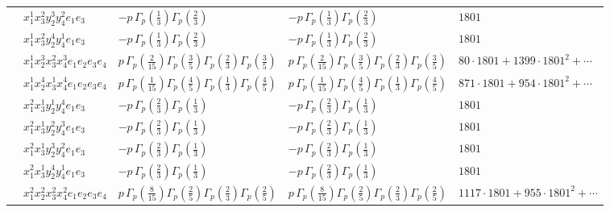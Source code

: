 \documentclass[11pt]{article}
\begin{document}
\begin{table}[ht]
{\begin{tabular}{@{}lllll@{}}
 & $x_{1}^{1} x_{3}^{2} y_{2}^{3} y_{4}^{2} e_{1} e_{3}$ & $- p \, \Gamma_p \left( \frac{1}{3} \right) \Gamma_p \left( \frac{2}{3} \right)$ & $- p \, \Gamma_p \left( \frac{1}{3} \right) \Gamma_p \left( \frac{2}{3} \right)$ & $1801$ \\
 & $x_{1}^{1} x_{3}^{2} y_{2}^{4} y_{4}^{1} e_{1} e_{3}$ & $- p \, \Gamma_p \left( \frac{1}{3} \right) \Gamma_p \left( \frac{2}{3} \right)$ & $- p \, \Gamma_p \left( \frac{1}{3} \right) \Gamma_p \left( \frac{2}{3} \right)$ & $1801$ \\
 & $x_{1}^{1} x_{2}^{3} x_{3}^{2} x_{4}^{3}  e_{1} e_{2} e_{3} e_{4}$ & $p \, \Gamma_p \left( \frac{2}{15} \right) \Gamma_p \left( \frac{3}{5} \right) \Gamma_p \left( \frac{2}{3} \right) \Gamma_p \left( \frac{3}{5} \right)$ & $p \, \Gamma_p \left( \frac{2}{15} \right) \Gamma_p \left( \frac{3}{5} \right) \Gamma_p \left( \frac{2}{3} \right) \Gamma_p \left( \frac{3}{5} \right)$ & $80{\cdot}1801{+}1399{\cdot}1801^{2}{+}\cdots$ \\
 & $x_{1}^{1} x_{2}^{4} x_{3}^{1} x_{4}^{4}  e_{1} e_{2} e_{3} e_{4}$ & $p \, \Gamma_p \left( \frac{1}{15} \right) \Gamma_p \left( \frac{4}{5} \right) \Gamma_p \left( \frac{1}{3} \right) \Gamma_p \left( \frac{4}{5} \right)$ & $p \, \Gamma_p \left( \frac{1}{15} \right) \Gamma_p \left( \frac{4}{5} \right) \Gamma_p \left( \frac{1}{3} \right) \Gamma_p \left( \frac{4}{5} \right)$ & $871{\cdot}1801{+}954{\cdot}1801^{2}{+}\cdots$ \\
 & $x_{1}^{2} x_{3}^{1} y_{2}^{1} y_{4}^{4} e_{1} e_{3}$ & $- p \, \Gamma_p \left( \frac{2}{3} \right) \Gamma_p \left( \frac{1}{3} \right)$ & $- p \, \Gamma_p \left( \frac{2}{3} \right) \Gamma_p \left( \frac{1}{3} \right)$ & $1801$ \\
 & $x_{1}^{2} x_{3}^{1} y_{2}^{2} y_{4}^{3} e_{1} e_{3}$ & $- p \, \Gamma_p \left( \frac{2}{3} \right) \Gamma_p \left( \frac{1}{3} \right)$ & $- p \, \Gamma_p \left( \frac{2}{3} \right) \Gamma_p \left( \frac{1}{3} \right)$ & $1801$ \\
 & $x_{1}^{2} x_{3}^{1} y_{2}^{3} y_{4}^{2} e_{1} e_{3}$ & $- p \, \Gamma_p \left( \frac{2}{3} \right) \Gamma_p \left( \frac{1}{3} \right)$ & $- p \, \Gamma_p \left( \frac{2}{3} \right) \Gamma_p \left( \frac{1}{3} \right)$ & $1801$ \\
 & $x_{1}^{2} x_{3}^{1} y_{2}^{4} y_{4}^{1} e_{1} e_{3}$ & $- p \, \Gamma_p \left( \frac{2}{3} \right) \Gamma_p \left( \frac{1}{3} \right)$ & $- p \, \Gamma_p \left( \frac{2}{3} \right) \Gamma_p \left( \frac{1}{3} \right)$ & $1801$ \\
 & $x_{1}^{2} x_{2}^{2} x_{3}^{2} x_{4}^{2}  e_{1} e_{2} e_{3} e_{4}$ & $p \, \Gamma_p \left( \frac{8}{15} \right) \Gamma_p \left( \frac{2}{5} \right) \Gamma_p \left( \frac{2}{3} \right) \Gamma_p \left( \frac{2}{5} \right)$ & $p \, \Gamma_p \left( \frac{8}{15} \right) \Gamma_p \left( \frac{2}{5} \right) \Gamma_p \left( \frac{2}{3} \right) \Gamma_p \left( \frac{2}{5} \right)$ & $1117{\cdot}1801{+}955{\cdot}1801^{2}{+}\cdots$ \\

\end{tabular}}
\end{table}
\end{document}
